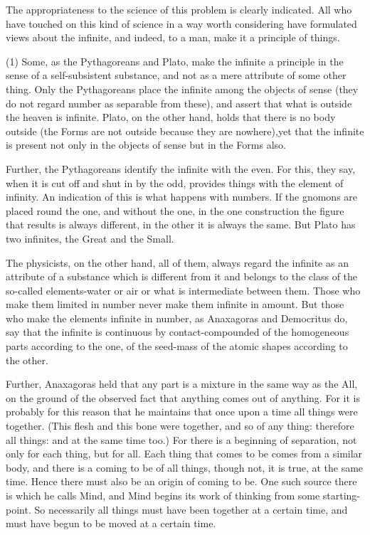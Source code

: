 The appropriateness to the science of this problem is clearly indicated.
All who have touched on this kind of science in a way worth considering
have formulated views about the infinite, and indeed, to a man, make
it a principle of things. 

(1) Some, as the Pythagoreans and Plato, make the infinite a principle
in the sense of a self-subsistent substance, and not as a mere attribute
of some other thing. Only the Pythagoreans place the infinite among
the objects of sense (they do not regard number as separable from
these), and assert that what is outside the heaven is infinite. Plato,
on the other hand, holds that there is no body outside (the Forms
are not outside because they are nowhere),yet that the infinite is
present not only in the objects of sense but in the Forms also.

Further, the Pythagoreans identify the infinite with the even. For
this, they say, when it is cut off and shut in by the odd, provides
things with the element of infinity. An indication of this is what
happens with numbers. If the gnomons are placed round the one, and
without the one, in the one construction the figure that results is
always different, in the other it is always the same. But Plato has
two infinites, the Great and the Small. 

The physicists, on the other hand, all of them, always regard the
infinite as an attribute of a substance which is different from it
and belongs to the class of the so-called elements-water or air or
what is intermediate between them. Those who make them limited in
number never make them infinite in amount. But those who make the
elements infinite in number, as Anaxagoras and Democritus do, say
that the infinite is continuous by contact-compounded of the homogeneous
parts according to the one, of the seed-mass of the atomic shapes
according to the other. 

Further, Anaxagoras held that any part is a mixture in the same way
as the All, on the ground of the observed fact that anything comes
out of anything. For it is probably for this reason that he maintains
that once upon a time all things were together. (This flesh and this
bone were together, and so of any thing: therefore all things: and
at the same time too.) For there is a beginning of separation, not
only for each thing, but for all. Each thing that comes to be comes
from a similar body, and there is a coming to be of all things, though
not, it is true, at the same time. Hence there must also be an origin
of coming to be. One such source there is which he calls Mind, and
Mind begins its work of thinking from some starting-point. So necessarily
all things must have been together at a certain time, and must have
begun to be moved at a certain time. 

